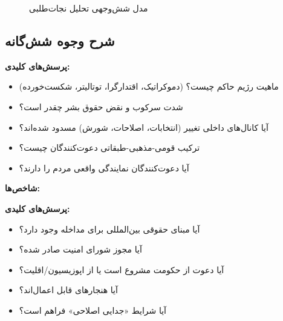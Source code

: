 \begin{figure}[htbp]
\caption{مدل شش‌وجهی تحلیل نجات‌طلبی}
\label{fig:ch03-hexagonal}
\end{figure}

\subsection{شرح وجوه شش‌گانه}
\label{subsec:ch03-hex-detail}

\begin{tcolorbox}[casebox, title={وجه ۱: تحلیل ساختاری-سیاسی}]
\textbf{پرسش‌های کلیدی:}
\begin{itemize}[nosep, rightmargin=1em]
  \item ماهیت رژیم حاکم چیست؟ (دموکراتیک، اقتدارگرا، توتالیتر، شکست‌خورده)
  \item شدت سرکوب و نقض حقوق بشر چقدر است؟
  \item آیا کانال‌های داخلی تغییر (انتخابات، اصلاحات، شورش) مسدود شده‌اند؟
  \item ترکیب قومی-مذهبی-طبقاتی دعوت‌کنندگان چیست؟
  \item آیا دعوت‌کنندگان نمایندگی واقعی مردم را دارند؟
\end{itemize}
\textbf{شاخص‌ها:} 
\end{tcolorbox}

\begin{tcolorbox}[casebox, title={وجه ۲: تحلیل حقوقی-هنجاری}]
\textbf{پرسش‌های کلیدی:}
\begin{itemize}[nosep, rightmargin=1em]
  \item آیا مبنای حقوقی بین‌المللی برای مداخله وجود دارد؟
  \item آیا مجوز شورای امنیت صادر شده؟
  \item آیا دعوت از حکومت مشروع است یا از اپوزیسیون/اقلیت؟
  \item آیا هنجارهای  قابل اعمال‌اند؟
  \item آیا شرایط «جدایی اصلاحی» فراهم است؟
\end{itemize}
\end{tcolorbox}

